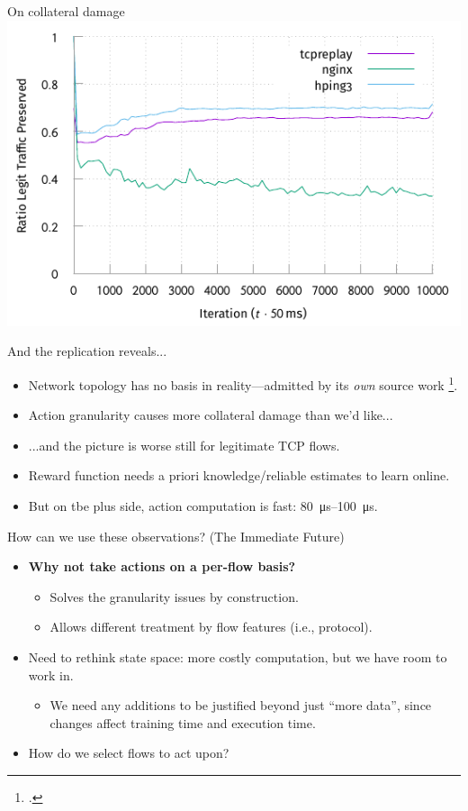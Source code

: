 \documentclass[aspectratio=169,xcolor={dvipsnames}
,hide notes
]{beamer}
\begin{document}
\begin{frame}{On collateral damage}
\centering
\includegraphics[width=0.8\linewidth]{../plots/online-varyN-nginx-pres.pdf}
\end{frame}

\begin{frame}{And the replication reveals...}	
\begin{itemize}
	\item Network topology has no basis in reality---admitted by its \emph{own} source work \footcite{DBLP:journals/ccr/MahajanBFIPS02a}.
	
	\item Action granularity causes more collateral damage than we'd like...
	
	\item ...and the picture is worse still for legitimate TCP flows.
	
	\item Reward function needs a priori knowledge/reliable estimates to learn online.
	
	\item \alert{But on tbe plus side, action computation is fast: \SIrange{80}{100}{\micro\second}.}
\end{itemize}
\end{frame}

\begin{frame}{How can we use these observations? (The Immediate Future)}
\begin{itemize}
	\item \textbf{\alert{Why not take actions on a per-flow basis?}}
	\begin{itemize}
		\item Solves the granularity issues by construction.
		\item Allows different treatment by flow features (i.e., protocol).
	\end{itemize}
	\item Need to rethink state space: more costly computation, but we have room to work in.
	\begin{itemize}
		\item We need any additions to be justified beyond just ``more data'', since \alert{changes affect training time and execution time}.
	\end{itemize}
	\item How do we select flows to act upon?
\end{itemize}
\end{frame}
\end{document}
